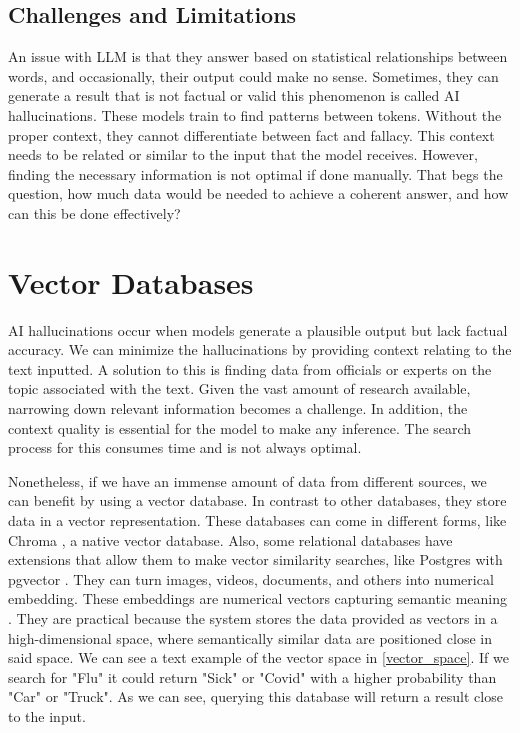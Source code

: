 \subsection{Challenges and Limitations}
An issue with LLM is that they answer based on statistical relationships between words, and occasionally, their output could make no sense. Sometimes, they can generate a result that is not factual
or valid this phenomenon is called AI hallucinations. These models train to find patterns between tokens. Without the proper context, they cannot differentiate between fact and fallacy. This context
needs to  be related or similar to the input that the model receives. However, finding the necessary information is not optimal if done manually. That begs the question, how much data would be needed
to achieve a coherent answer, and how can this be done effectively?


\section{Vector Databases}
AI hallucinations occur when models generate a plausible output but lack factual accuracy. We can minimize the hallucinations by providing context relating to the text inputted. A solution to this
is finding data from officials or experts on the topic associated with the text. Given the vast amount of research available, narrowing down relevant information becomes a challenge. In addition,
the context quality is essential for the model to make any inference. The search process for this consumes time and is not always optimal. 

Nonetheless, if we have an immense amount of data from different sources, we can benefit by using a vector database. In contrast to other databases, they store data in a vector representation.
These databases can come in different forms, like Chroma \cite{chroma}, a native vector database. Also, some relational databases have extensions that allow them to make vector similarity searches,
like Postgres with pgvector \cite{pgvector}. They can turn images, videos, documents, and others into numerical embedding. These embeddings are numerical vectors capturing semantic meaning \cite{10455990}.
They are practical because the system stores the data provided as vectors in a high-dimensional space, where semantically similar data are positioned close in said space. We can see a text example of the vector
space in \ref{vector_space}. If we search for "Flu" it could return "Sick" or "Covid" with a higher probability than "Car" or "Truck". As we can see, querying this database will return a result close to the input.

